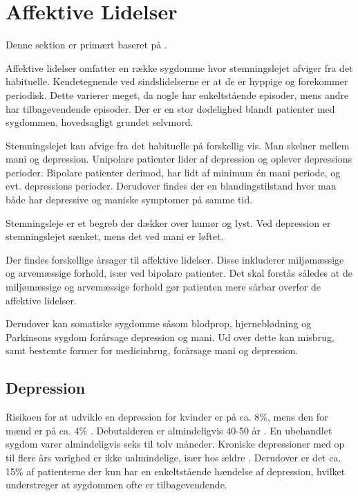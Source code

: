 
\section{Affektive Lidelser}\label{sec:affektivelidelser}
Denne sektion er primært baseret på \citet{misc:affektivelidelser, misc:netpsykdepression, misc:netpsykmani}.

Affektive lidelser omfatter en række sygdomme hvor stemningslejet afviger fra det habituelle.
Kendetegnende ved sindslidelserne er at de er hyppige og forekommer periodisk.
Dette varierer meget, da nogle har enkeltstående episoder, mens andre har tilbagevendende episoder.
Der er en stor dødelighed blandt patienter med sygdommen, hovedsagligt grundet selvmord.

Stemningslejet kan afvige fra det habituelle på forskellig vis.
Man skelner mellem mani og depression.
Unipolare patienter lider af depression og oplever depressions perioder.
Bipolare patienter derimod, har lidt af minimum én mani periode, og evt. depressions perioder.
Derudover findes der en blandingstilstand hvor man både har depressive og maniske symptomer på samme tid.

Stemningsleje er et begreb der dækker over humør og lyst.
Ved depression er stemningslejet sænket, mens det ved mani er løftet.

Der findes forskellige årsager til affektive lidelser. 
Disse inkluderer miljømæssige og arvemæssige forhold, især ved bipolare patienter.
Det skal forstås således at de miljømæssige og arvemæssige forhold gør patienten mere sårbar overfor de affektive lidelser.

Derudover kan somatiske sygdomme såsom blodprop, hjerneblødning og Parkinsons sygdom forårsage depression og mani.
Ud over dette kan misbrug, samt bestemte former for medicinbrug, forårsage mani og depression.

\subsection{Depression}
Risikoen for at udvikle en depression for kvinder er på ca. 8\%, mens den for mænd er på ca. 4\% \citep{misc:affektivelidelser}.
Debutalderen er almindeligvis 40-50 år \citep{misc:affektivelidelser}.
En ubehandlet sygdom varer almindeligvis seks til tolv måneder.
Kroniske depressioner med op til flere års varighed er ikke ualmindelige, især hos ældre \citep{misc:affektivelidelser}.
Derudover er det ca. 15\% af patienterne der kun har en enkeltstående hændelse af depression, hvilket understreger at sygdommen ofte er tilbagevendende.

